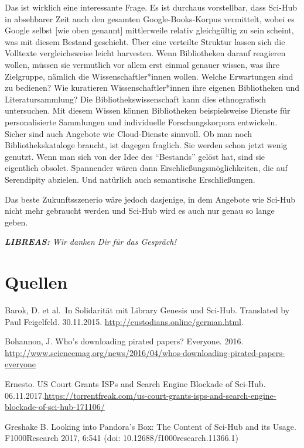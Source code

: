 \documentclass[a4paper,
fontsize=11pt,
oneside,
numbers=noperiodatend,
parskip=half-,
bibliography=totoc,
final
]{scrartcl}
\begin{document}
Das ist wirklich eine interessante Frage. Es ist durchaus vorstellbar,
dass Sci-Hub in absehbarer Zeit auch den gesamten Google-Books-Korpus
vermittelt, wobei es Google selbst {[}wie oben genannt{]} mittlerweile
relativ gleichgültig zu sein scheint, was mit diesem Bestand geschieht.
Über eine verteilte Struktur lassen sich die Volltexte vergleichsweise
leicht harvesten. Wenn Bibliotheken darauf reagieren wollen, müssen sie
vermutlich vor allem erst einmal genauer wissen, was ihre Zielgruppe,
nämlich die Wissenschaftler*innen wollen. Welche Erwartungen sind zu
bedienen? Wie kuratieren Wissenschaftler*innen ihre eigenen Bibliotheken
und Literatursammlung? Die Bibliothekswissenschaft kann dies
ethnografisch untersuchen. Mit diesem Wissen können Bibliotheken
beispielsweise Dienste für personalisierte Sammlungen und individuelle
Forschungskorpora entwickeln. Sicher sind auch Angebote wie
Cloud-Dienste sinnvoll. Ob man noch Bibliothekskataloge braucht, ist
dagegen fraglich. Sie werden schon jetzt wenig genutzt. Wenn man sich
von der Idee des \enquote{Bestands} gelöst hat, sind sie eigentlich
obsolet. Spannender wären dann Erschließungsmöglichkeiten, die auf
Serendipity abzielen. Und natürlich auch semantische Erschließungen.

Das beste Zukunftsszenerio wäre jedoch dasjenige, in dem Angebote wie
Sci-Hub nicht mehr gebraucht werden und Sci-Hub wird es auch nur genau
so lange geben.

\emph{\textbf{LIBREAS:} Wir danken Dir für das Gespräch!}

\hypertarget{quellen}{%
\section*{Quellen}\label{quellen}}

Barok, D. et al.~In Solidarität mit Library Genesis und Sci-Hub.
Translated by Paul Feigelfeld. 30.11.2015.
\url{http://custodians.online/german.html}.

Bohannon, J. Who's downloading pirated papers? Everyone. 2016.
\url{http://www.sciencemag.org/news/2016/04/whos-downloading-pirated-papers-everyone}

Ernesto. US Court Grants ISPs and Search Engine Blockade of Sci-Hub.
06.11.2017.\url{https://torrentfreak.com/us-court-grants-isps-and-search-engine-blockade-of-sci-hub-171106/}

Greshake B. Looking into Pandora's Box: The Content of Sci-Hub and its
Usage. F1000Research 2017, 6:541 (doi: 10.12688/f1000research.11366.1)
\end{document}
